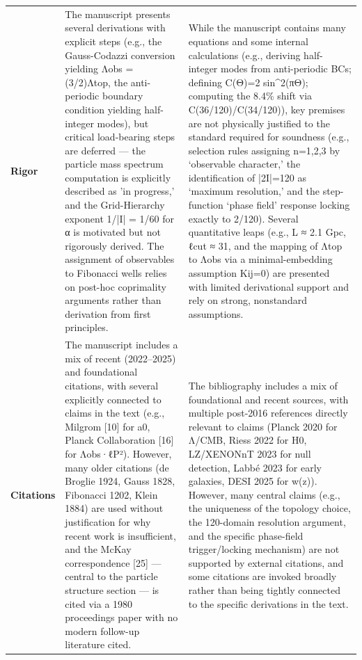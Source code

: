 \documentclass[11pt]{article}
\begin{document}
\begin{longtable}{@{} p{2.2cm} p{6.3cm} p{6.3cm} @{}}
\rowcolor{rowgray}
\textbf{Rigor} &
The manuscript presents several derivations with explicit steps (e.g., the Gauss-Codazzi conversion yielding Λobs = (3/2)Λtop, the anti-periodic boundary condition yielding half-integer modes), but critical load-bearing steps are deferred — the particle mass spectrum computation is explicitly described as 'in progress,' and the Grid-Hierarchy exponent 1/|I| = 1/60 for α is motivated but not rigorously derived. The assignment of observables to Fibonacci wells relies on post-hoc coprimality arguments rather than derivation from first principles. &
While the manuscript contains many equations and some internal calculations (e.g., deriving half-integer modes from anti-periodic BCs; defining C(Θ)=2 sin\textasciicircum{}2(πΘ); computing the 8.4\% shift via C(36/120)/C(34/120)), key premises are not physically justified to the standard required for soundness (e.g., selection rules assigning n=1,2,3 by ‘observable character,’ the identification of |2I|=120 as ‘maximum resolution,’ and the step-function ‘phase field’ response locking exactly to 2/120). Several quantitative leaps (e.g., L ≈ 2.1 Gpc, ℓcut ≈ 31, and the mapping of Λtop to Λobs via a minimal-embedding assumption Kij=0) are presented with limited derivational support and rely on strong, nonstandard assumptions. \\[6pt]

\textbf{Citations} &
The manuscript includes a mix of recent (2022–2025) and foundational citations, with several explicitly connected to claims in the text (e.g., Milgrom [10] for a0, Planck Collaboration [16] for Λobs·ℓP²). However, many older citations (de Broglie 1924, Gauss 1828, Fibonacci 1202, Klein 1884) are used without justification for why recent work is insufficient, and the McKay correspondence [25] — central to the particle structure section — is cited via a 1980 proceedings paper with no modern follow-up literature cited. &
The bibliography includes a mix of foundational and recent sources, with multiple post-2016 references directly relevant to claims (Planck 2020 for Λ/CMB, Riess 2022 for H0, LZ/XENONnT 2023 for null detection, Labbé 2023 for early galaxies, DESI 2025 for w(z)). However, many central claims (e.g., the uniqueness of the topology choice, the 120-domain resolution argument, and the specific phase-field trigger/locking mechanism) are not supported by external citations, and some citations are invoked broadly rather than being tightly connected to the specific derivations in the text. \\

\end{longtable}
\end{document}

